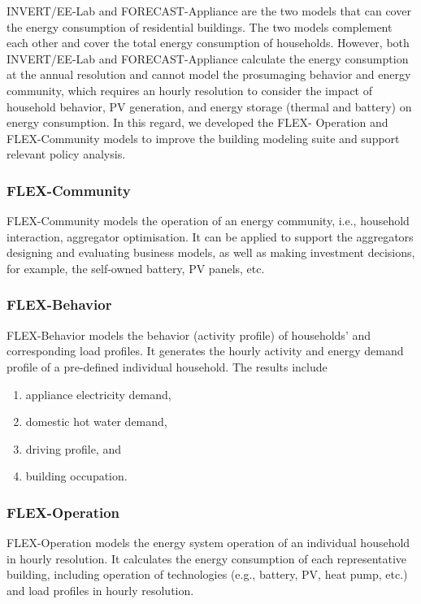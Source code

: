 INVERT/EE-Lab and FORECAST-Appliance are the two models that can cover the energy consumption of residential buildings. The two models complement each other and cover the total energy consumption of households. 
However, both INVERT/EE-Lab and FORECAST-Appliance calculate the energy consumption at the annual resolution and cannot model the prosumaging behavior and energy community, which requires an hourly resolution to consider the impact of household behavior, PV generation, and energy storage (thermal and battery) on energy consumption. In this regard, we developed the FLEX- Operation and FLEX-Community models to improve the building modeling suite and support relevant policy analysis.


\subsubsection{FLEX-Community}

FLEX-Community models the operation of an energy community, i.e., household interaction, aggregator optimisation. 
It can be applied to support the aggregators designing and evaluating business models, as well as making investment decisions, for example, the self-owned battery, PV panels, etc.


\subsubsection{FLEX-Behavior}

FLEX-Behavior models the behavior (activity profile) of households' and corresponding load profiles. 
It generates the hourly activity and energy demand profile of a pre-defined individual household. 
The results include

\begin{enumerate}
  \item appliance electricity demand,
  \item domestic hot water demand,
  \item driving profile, and
  \item building occupation.
\end{enumerate}


\subsubsection{FLEX-Operation}

FLEX-Operation models the energy system operation of an individual household in hourly resolution.  
It calculates the energy consumption of each representative building, including operation of technologies (e.g., battery, PV, heat pump, etc.) and load profiles in hourly resolution.

